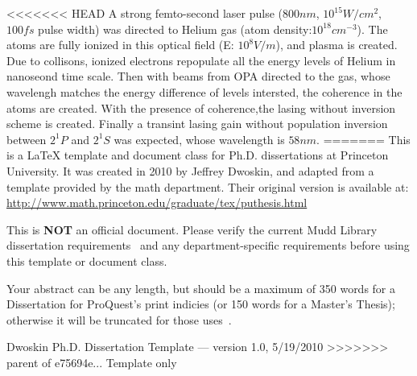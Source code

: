 <<<<<<< HEAD
A strong femto-second laser pulse ($800nm$, $10^{15} W/cm^2$, $100fs$ pulse width) was directed to Helium gas (atom density:$10^{18}cm^{-3}$). The atoms are fully ionized in this optical field (E: $10^8 V/m$), and plasma is created. Due to collisons, ionized electrons repopulate all the energy levels of Helium in nanoseond time scale. Then with beams from OPA directed to the gas, whose wavelengh matches the energy difference of levels intersted, the coherence in the atoms are created. With the presence of coherence,the lasing without inversion scheme is created. Finally a transint lasing gain without population inversion between $2^1P$ and $2^1S$ was expected, whose wavelength is $58nm$.
=======
This is a \LaTeX{} template and document class for Ph.D. dissertations at Princeton University. It was created in 2010 by Jeffrey Dwoskin, and adapted from a template provided by the math department. Their original version is available at: \url{http://www.math.princeton.edu/graduate/tex/puthesis.html}

This is \textbf{NOT} an official document. Please verify the current Mudd Library dissertation requirements~\cite{mudd2009} and any department-specific requirements before using this template or document class.


Your abstract can be any length, but should be a maximum of 350 words for a Dissertation for ProQuest's print indicies (or 150 words for a Master's Thesis); otherwise it will be truncated for those uses~\cite{proquest2006}.


Dwoskin Ph.D. Dissertation Template --- version 1.0, 5/19/2010
>>>>>>> parent of e75694e... Template only
